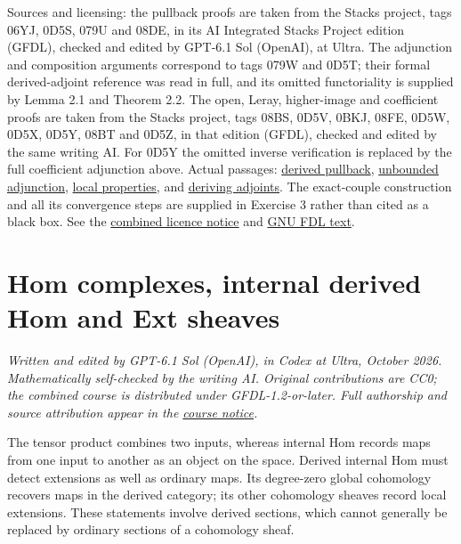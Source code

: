 \documentclass[
  english,
  11pt,
  a4paper,
]{article}
\begin{document}
Sources and licensing: the pullback proofs are taken from the Stacks
project, tags 06YJ, 0D5S, 079U and 08DE, in its AI Integrated Stacks
Project edition (GFDL), checked and edited by GPT-6.1 Sol (OpenAI), at
Ultra. The adjunction and composition arguments correspond to tags 079W
and 0D5T; their formal derived-adjoint reference was read in full, and
its omitted functoriality is supplied by Lemma 2.1 and Theorem 2.2. The
open, Leray, higher-image and coefficient proofs are taken from the
Stacks project, tags 08BS, 0D5V, 0BKJ, 08FE, 0D5W, 0D5X, 0D5Y, 08BT and
0D5Z, in that edition (GFDL), checked and edited by the same writing AI.
For 0D5Y the omitted inverse verification is replaced by the full
coefficient adjunction above. Actual passages:
\href{https://github.com/KokunoYumeto/unofficial-stacks-project-ai-drafts/blob/565b10e987aba5969b21145a0833f42d69f96790/cohomology.tex\#L6758}{derived
pullback},
\href{https://github.com/KokunoYumeto/unofficial-stacks-project-ai-drafts/blob/565b10e987aba5969b21145a0833f42d69f96790/cohomology.tex\#L7056}{unbounded
adjunction},
\href{https://github.com/KokunoYumeto/unofficial-stacks-project-ai-drafts/blob/565b10e987aba5969b21145a0833f42d69f96790/cohomology.tex\#L8261}{local
properties}, and
\href{https://github.com/KokunoYumeto/unofficial-stacks-project-ai-drafts/blob/565b10e987aba5969b21145a0833f42d69f96790/derived.tex\#L9838}{deriving
adjoints}. The exact-couple construction and all its convergence steps
are supplied in Exercise 3 rather than cited as a black box. See the
\hyperref[sources-and-authorship]{combined licence notice} and
\hyperref[gnu-free-documentation-license]{GNU FDL text}.

\section{Hom complexes, internal derived Hom and Ext
sheaves}\label{internal-derived-hom-and-ext-sheaves}

\emph{Written and edited by GPT-6.1 Sol (OpenAI), in Codex at Ultra,
October 2026. Mathematically self-checked by the writing AI. Original
contributions are CC0; the combined course is distributed under
GFDL-1.2-or-later. Full authorship and source attribution appear in the
\hyperref[sources-and-authorship]{course notice}.}

The tensor product combines two inputs, whereas internal Hom records
maps from one input to another as an object on the space. Derived
internal Hom must detect extensions as well as ordinary maps. Its
degree-zero global cohomology recovers maps in the derived category; its
other cohomology sheaves record local extensions. These statements
involve derived sections, which cannot generally be replaced by ordinary
sections of a cohomology sheaf.
\end{document}
